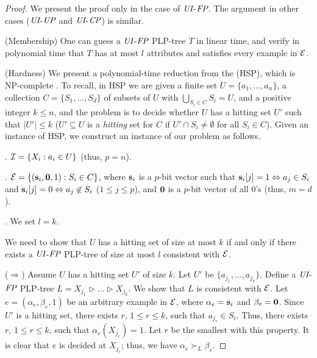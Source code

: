 \begin{proof}
	We present the proof only in the case of $\textit{UI}$-$\textit{FP}$. The argument in other cases 
	($\textit{UI}$-$\textit{UP}$ and $\textit{UI}$-$\textit{CP}$) is similar.

	(Membership) One can guess a $\textit{UI}$-$\textit{FP}$ PLP-tree $T$ in linear time, and verify in polynomial time that 
	$T$ has at most $l$ attributes and satisfies every example in $\mathcal{E}$.

	(Hardness) We present a polynomial-time reduction from the
	 (HSP), which is NP-complete 
    \cite{Garey:1979}. To recall, in HSP we are given a finite
		set $U=\{a_1,\ldots,a_n\}$, a collection $C=\{S_1,\ldots,
    S_d\}$ of subsets of $U$ with $\bigcup_{S_i \in C} S_i = U$,
    and a positive integer $k \leq n$, and the problem is to
    decide whether $U$ has a hitting set $U'$ such that $|U'|\leq k$ 
    ($U'\subseteq U$ is a \emph{hitting} set for $C$ if 
		$U' \cap S_i \not = \emptyset$ for all $S_i \in C$).
	Given an instance of HSP, we construct an instance of our problem as follows.

	. $\mathcal{I}=\{X_i: a_i \in U\}$ (thus, $p=n$).

	. $\mathcal{E}=\{(\textbf{s}_i, \textbf{0},1): S_i \in C\}$, where
	$\textbf{s}_i$ is a $p$-bit vector such that $\textbf{s}_i[j]=1 \Leftrightarrow a_j \in S_i$
	and $\textbf{s}_i[j]=0 \Leftrightarrow a_j \not \in S_i$ ($1 \leq j \leq p$), 
	and $\textbf{0}$ is a $p$-bit vector of all $0$'s (thus, $m=d$).

	. We set $l=k$.

	We need to show that $U$ has a hitting set of size at most $k$ if and only if
	there exists a $\textit{UI}$-$\textit{FP}$ PLP-tree of size at most $l$ consistent with $\mathcal{E}$.

\smallskip
\noindent
	($\Rightarrow$) Assume $U$ has a hitting set $U'$ of size $k$.
	Let $U'$ be $\{a_{j_1},\ldots,a_{j_k}\}$.
	Define a $\textit{UI}$-$\textit{FP}$ PLP-tree $L=X_{j_1} \triangleright \ldots \triangleright X_{j_k}$.
	We show that $L$ is consistent with $\mathcal{E}$.
	Let $e=(\alpha_e,\beta_e,1)$ be an arbitrary example in $\mathcal{E}$, where
	$\alpha_e=\textbf{s}_i$ and $\beta_e=\textbf{0}$.
	Since $U'$ is a hitting set, %
        there exists $r$, $1 \leq r \leq k$, 
        such that $a_{j_r} \in S_i$.
	Thus, %
        there exists $r$, $1 \leq r \leq k$, %
	such that $\alpha_e(X_{j_r})=1$.
	Let $r$ be the smallest with this property. 
	It is clear that $e$ is decided at $X_{j_r}$; thus, we have 
	$\alpha_e \succ_L \beta_e$.


\end{proof}
